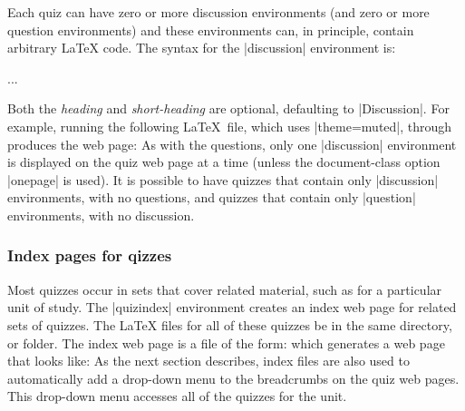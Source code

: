 \documentclass[svgnames]{article}
\begin{document}
  Each quiz can have zero or more discussion
  environments (and zero or more question environments) and these
  environments can, in principle, contain arbitrary \LaTeX{} code. The
  syntax for the \LatexCode|discussion| environment is:
  \begin{latexcode}
    \begin{dicussion}
      ...
    \end{dicussion}
  \end{latexcode}
  Both the \textit{heading} and \textit{short-heading} are optional,
  defaulting to \LatexCode|Discussion|.
  For example, running the following \LaTeX\ file, which uses
  \LatexCode|theme=muted|, through \WebQuiz
  produces the web page:
   As with the questions, only one
  \LatexCode|discussion| environment is displayed on the quiz web page
  at a time (unless the document-class option \LatexCode|onepage| is
  used). It is possible to have quizzes that contain only
  \LatexCode|discussion| environments, with no questions, and quizzes
  that contain only \LatexCode|question| environments, with no
  discussion.

  \subsubsection{Index pages for qizzes}\label{SS:index}


    Most quizzes occur in sets that cover related material, such as for
    a particular unit of study. The \LatexCode|quizindex| environment
    creates an index web page for related sets of quizzes. The \LaTeX{}
    files for all of these quizzes be in the same directory, or folder.
    The index web page is a \WebQuiz file of the form:
    which generates a web page that looks like:
    As the next section describes, index files are also used to
    automatically add a drop-down menu to the breadcrumbs on the quiz web
    pages. This drop-down menu accesses all of the quizzes for the unit.
\end{document}
